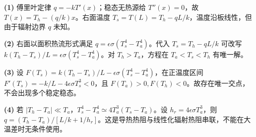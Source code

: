\par\noindent\textbf{(1)} 傅里叶定律 \(q=-kT'(x)\)；稳态无热源给 \(T''(x)=0\)，故 \(T(x)=T_h-(q/k)x\)。右面温度 \(T_s=T(L)=T_h-qL/k\)，温度沿板线性，但由于辐射边界 \(q\) 未知。
\par\noindent\textbf{(2)} 右面以面积热流形式满足 \(q=\epsilon\sigma(T_s^4-T_a^4)\)。代入 \(T_s=T_h-qL/k\) 可改写 \(k(T_h-T_s)/L=\epsilon\sigma(T_s^4-T_a^4)\)。对 \(T_h>T_a\)，方程在 \(T_a<T_s<T_h\) 有唯一解。
\par\noindent\textbf{(3)} 设 \(F(T_s)=k(T_h-T_s)/L-\epsilon\sigma(T_s^4-T_a^4)\)，在正温度区间 \(F'(T_s)=-k/L-4\epsilon\sigma T_s^3<0\)，且 \(F(T_a)>0,F(T_h)<0\)。故存在唯一交点，不会出现多个稳定稳态。
\par\noindent\textbf{(4)} 若 \(|T_h-T_a|\ll T_a\)，\(T_s^4-T_a^4\simeq4T_a^3(T_s-T_a)\)。设 \(h_r=4\epsilon\sigma T_a^3\)，则 \(q=(T_h-T_a)/[L/k+1/h_r]\)。这是导热热阻与线性化辐射热阻串联，不能在大温差时无条件使用。
